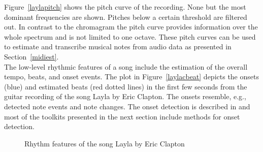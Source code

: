 \noindent Figure~\ref{laylapitch} shows the pitch curve of the recording. None but the most dominant frequencies are shown. Pitches below a certain threshold are filtered out. In contrast to the chromagram the pitch curve provides information over the whole spectrum and is not limited to one octave. These pitch curves can be used to estimate and transcribe musical notes from audio data as presented in Section~\ref{midiest}.\\
\noindent The low-level rhythmic features of a song include the estimation of the overall tempo, beats, and onset events. 
The plot in Figure~\ref{laylacbeat} depicts the onsets (blue) and estimated beats (red dotted lines) in the first few seconds from the guitar recording of the song Layla by Eric Clapton. The onsets resemble, e.g., detected note events and note changes. The onset detection is described in \cite[pp. 412 ff]{musicdata} and most of the toolkits presented in the next section include methods for onset detection. %
\begin{figure}[htbp]
	\centering
	\caption{Rhythm features of the song Layla by Eric Clapton}
	\label{fig:feat2}
\end{figure}
\FloatBarrier

